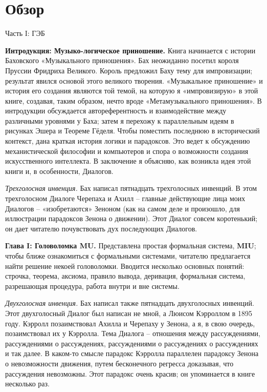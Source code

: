 \documentclass[../main.tex]{subfiles}
\begin{document}
\chapter{Обзор}

\begin{center}
    \Large
    Часть I: ГЭБ
\end{center}

\textbf{Интродукция: Музыко-логическое приношение.}
Книга начинается с истории Баховского «Музыкального приношения». Бах неожиданно посетил короля Пруссии Фридриха Великого. Король предложил Баху тему для импровизации; результат явился основой этого великого творения. «Музыкальное приношение» и история его создания являются той темой, на которую я «импровизирую» в этой книге, создавая, таким образом, нечто вроде «Метамузыкального приношения». В интродукции обсуждается автореферентность и взаимодействие между различными уровнями у Баха; затем я перехожу к параллельным идеям в рисунках Эшера и Теореме Гёделя. Чтобы поместить последнюю в исторический контекст, дана краткая история логики и парадоксов. Это ведет к обсуждению механистической философии и компьютеров и спора о возможности создания искусственного интеллекта. В заключение я объясняю, как возникла идея этой книги и, в особенности, Диалогов.

\emph{Трехголосная инвенция.}
Бах написал пятнадцать трехголосных инвенций. В этом трехголосном Диалоге Черепаха и Ахилл \--- главные действующие лица моих Диалогов \--- «изобретаются» Зеноном (как на самом деле и произошло, для иллюстрации парадоксов Зенона о движении). Этот Диалог совсем коротенький; он дает читателю почувствовать дух последующих Диалогов.

\textbf{Глава I: Головоломка MU.}
Представлена простая формальная система, \textbf{MIU}; чтобы ближе ознакомиться с формальными системами, читателю предлагается найти решение некоей головоломки. Вводится несколько основных понятий: строчка, теорема, аксиома, правило вывода, деривация, формальная система, разрешающая процедура, работа внутри и вне системы.

\emph{Двухголосная инвенция.}
Бах написал также пятнадцать двухголосных инвенций. Этот двухголосный Диалог был написан не мной, а Люисом Кэрроллом в 1895 году. Кэрролл позаимствовал Ахилла и Черепаху у Зенона, а я, в свою очередь, позаимствовал их у Кэрролла. Тема Диалога \--- отношения между рассуждениями, рассуждениями о рассуждениях, рассуждениями о рассуждениях о рассуждениях и так далее. В каком-то смысле парадокс Кэрролла параллелен парадоксу Зенона о невозможности движения, путем бесконечного регресса доказывая, что рассуждения невозможны. Этот парадокс очень красив; он упоминается в книге несколько раз.
\end{document}
